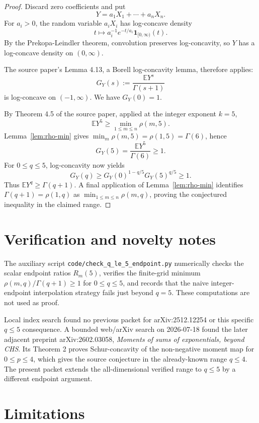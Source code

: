 \documentclass[11pt]{article}
\newcommand{\E}{\mathbb{E}}
\newcommand{\one}{\mathbf{1}}
\begin{document}
\begin{proof}
Discard zero coefficients and put
\[
Y=a_1X_1+\cdots+a_nX_n.
\]
For \(a_i>0\), the random variable \(a_iX_i\) has log-concave density
\[
t\mapsto a_i^{-1}e^{-t/a_i}\one_{[0,\infty)}(t).
\]
By the Prekopa-Leindler theorem, convolution preserves log-concavity, so \(Y\)
has a log-concave density on \((0,\infty)\).

The source paper's Lemma 4.13, a Borell log-concavity lemma, therefore applies:
\[
G_Y(s):=\frac{\E Y^s}{\Gamma(s+1)}
\]
is log-concave on \((-1,\infty)\).  We have \(G_Y(0)=1\).

By Theorem 4.5 of the source paper, applied at the integer exponent \(k=5\),
\[
\E Y^5\ge \min_{1\le m\le n}\rho(m,5).
\]
Lemma~\ref{lem:rho-min} gives \(\min_m\rho(m,5)=\rho(1,5)=\Gamma(6)\), hence
\[
G_Y(5)=\frac{\E Y^5}{\Gamma(6)}\ge 1.
\]
For \(0\le q\le 5\), log-concavity now yields
\[
G_Y(q)\ge G_Y(0)^{1-q/5}G_Y(5)^{q/5}\ge 1.
\]
Thus \(\E Y^q\ge \Gamma(q+1)\).  A final application of
Lemma~\ref{lem:rho-min} identifies \(\Gamma(q+1)=\rho(1,q)\) as
\(\min_{1\le m\le n}\rho(m,q)\), proving the conjectured inequality in the
claimed range.
\end{proof}

\section{Verification and novelty notes}

The auxiliary script \texttt{code/check\_q\_le\_5\_endpoint.py} numerically
checks the scalar endpoint ratios \(R_m(5)\), verifies the finite-grid
minimum \(\rho(m,q)/\Gamma(q+1)\ge 1\) for \(0\le q\le 5\), and records that
the naive integer-endpoint interpolation strategy fails just beyond \(q=5\).
These computations are not used as proof.

Local index search found no previous packet for arXiv:2512.12254 or this
specific \(q\le 5\) consequence.  A bounded web/arXiv search on 2026-07-18
found the later adjacent preprint arXiv:2602.03058, \emph{Moments of sums of
exponentials, beyond CHS}.  Its Theorem 2 proves Schur-concavity of the
non-negative moment map for \(0\le p\le 4\), which gives the source conjecture
in the already-known range \(q\le 4\).  The present packet extends the
all-dimensional verified range to \(q\le 5\) by a different endpoint argument.

\section{Limitations}
\end{document}
